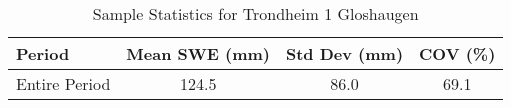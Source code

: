 
    \begin{table}[h!]
        \centering
        \caption{Sample Statistics for Trondheim 1 Gloshaugen}
        \begin{tabular}{lccc} 
            \toprule
            \textbf{Period} & \textbf{Mean SWE (mm)} & \textbf{Std Dev (mm)} & \textbf{COV (\%)} \\
            \midrule
            Entire Period & 124.5 & 86.0 & 69.1 \\
            \bottomrule
        \end{tabular}
        \label{tab:sample_stats_Trondheim 1 Gloshaugen}
    \end{table}
    